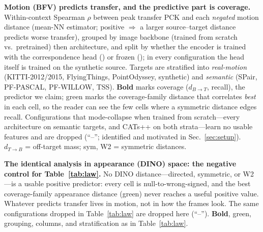 \documentclass[runningheads]{llncs}
\newcommand{\dtb}{d_{T\to B}}
\newcommand{\dbt}{d_{B\to T}}
\newcommand{\enctrained}{\textcolor{orange!90!red}{\faFire}}
\newcommand{\encfrozen}{\textcolor{cyan!55!blue}{\faSnowflake[regular]}}
\newcommand{\bst}[1]{\textcolor{green!60!black}{#1}}
\begin{document}
\begin{table}[t]
\centering
\caption{\textbf{Motion (BFV) predicts transfer, and the predictive part is
coverage.} Within-context Spearman $\rho$ between peak transfer PCK and each
\emph{negated} motion distance (mean-NN estimator; positive $\Rightarrow$ a
larger source--target distance predicts worse transfer), grouped by image
backbone (trained from scratch vs.\ pretrained) then architecture, and
split by whether the encoder is trained with the correspondence head
(\enctrained) or frozen (\encfrozen); in every configuration the head itself is
trained on the synthetic source.
Targets are stratified into \emph{real-motion} (KITTI-2012/2015, FlyingThings,
PointOdyssey, synthetic) and \emph{semantic} (SPair, PF-PASCAL, PF-WILLOW, TSS).
\textbf{Bold} marks coverage ($\dbt$, recall), the predictor we claim;
\bst{green} marks the coverage-family distance that correlates \emph{best} in
each cell, so the reader can see the few cells where a symmetric distance edges
recall. Configurations that mode-collapse when trained from scratch---every
architecture on semantic targets, and CATs++ on both strata---learn no usable
features and are dropped (``--''; identified and motivated in
Sec.~\ref{sec:setup}). $\dtb$ = off-target mass; sym, W2 = symmetric distances.}
\label{tab:law}
\footnotesize
\setlength{\tabcolsep}{4pt}

\end{table}

\begin{table}[t]
\centering
\caption{\textbf{The identical analysis in appearance (DINO) space: the
negative control for Table~\ref{tab:law}.} No DINO distance---directed,
symmetric, or W2---is a usable positive predictor: every cell is
null-to-wrong-signed, and the best coverage-family appearance distance
(\bst{green}) never reaches a useful positive value. Whatever predicts transfer
lives in motion, not in how the frames look. The same configurations dropped in
Table~\ref{tab:law} are dropped here (``--''). \textbf{Bold}, \bst{green},
grouping, columns, and stratification as in Table~\ref{tab:law}.}
\label{tab:lawdino}
\footnotesize
\setlength{\tabcolsep}{4pt}

\end{table}
\end{document}

